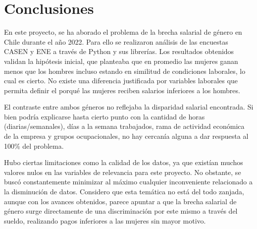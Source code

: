 \section{Conclusiones}

En este proyecto, se ha aborado el problema de la brecha salarial de género en Chile durante el año 2022. Para ello se realizaron análisis de las encuestas CASEN y ENE a través de Python y sus librerías. Los resultados obtenidos validan la hipótesis inicial, que planteaba que en promedio las mujeres ganan menos que los hombres incluso estando en similitud de condiciones laborales, lo cual es cierto. No existe una diferencia justificada por variables laborales que permita definir el porqué las mujeres reciben salarios inferiores a los hombres. 

El contraste entre ambos géneros no reflejaba la disparidad salarial encontrada. Si bien podría explicarse hasta cierto punto con la cantidad de horas (diarias/semanales), días a la semana trabajados, rama de actividad económica de la empresa y grupos ocupacionales, no hay cercanía alguna a dar respuesta al 100\% del problema. 

Hubo ciertas limitaciones como la calidad de los datos, ya que existían muchos valores nulos en las variables de relevancia para este proyecto. No obstante, se buscó constantemente minimizar al máximo cualquier inconveniente relacionado a la disminución de datos. Considero que esta temática no está del todo zanjada, aunque con los avances obtenidos, parece apuntar a que la brecha salarial de género surge directamente de una discriminación por este mismo a través del sueldo, realizando pagos inferiores a las mujeres sin mayor motivo.